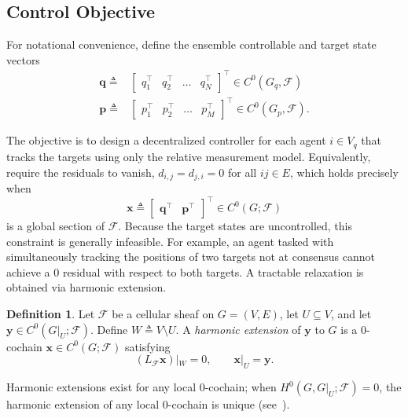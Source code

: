 \documentclass[letterpaper, 10 pt, conference]{ieeeconf}
\newcommand{\define}[1]{\emph{#1}}
\newcommand{\FF}{\mathcal{F}}
\theoremstyle{definition}
\newtheorem{definition}{Definition}
\begin{document}
\subsection{Control Objective}

For notational convenience, define the ensemble controllable and target state vectors
\[\begin{aligned}
    \mathbf{q} \triangleq& \begin{bmatrix}
        q_1^\top & q_2^\top & \dots & q_N^\top
    \end{bmatrix}^\top \in C^0(G_q,\FF)\\
    \mathbf{p}\triangleq& \begin{bmatrix}
        p_1^\top & p_2^\top &\dots & p_M^\top
    \end{bmatrix}^\top\in C^0(G_p,\FF).
\end{aligned}
\]

The objective is to design a decentralized controller for each agent
$i\in V_q$ that tracks the targets using only the relative measurement model. Equivalently, require the residuals to vanish, $d_{i,j} = d_{j,i} = 0$ for all $ij\in E$, which holds precisely when
\[\mathbf{x}\triangleq\begin{bmatrix}
    \mathbf{q}^\top & \mathbf{p}^\top
\end{bmatrix}^\top\in C^0(G;\FF)\]
is a global section of $\FF$. Because the target states are uncontrolled, this constraint is generally infeasible. For example, an agent tasked with simultaneously tracking the positions of two targets not at consensus cannot achieve a 0 residual with respect to both targets. A tractable relaxation is obtained via harmonic extension.
\begin{definition}
    Let $\FF$ be a cellular sheaf on $G=(V,E)$, let $U\subseteq V$, and let $\mathbf{y}\in C^0(G|_U;\FF)$. Define $W \triangleq V\setminus U$. A \define{harmonic extension} of $\mathbf{y}$ to $G$ is a 0-cochain $\mathbf{x}\in C^0(G;\FF)$ satisfying
    \[
    (L_\FF\mathbf{x})|_W = 0,\qquad \mathbf{x}|_U = \mathbf{y}.
    \]
\end{definition}
Harmonic extensions exist for any local 0-cochain; when $H^0(G,G|_U;\FF)=0$, the harmonic extension of any local 0-cochain is unique (see~\cite[Proposition~4.1]{Hansen.Jakob2019a}). 
\end{document}
